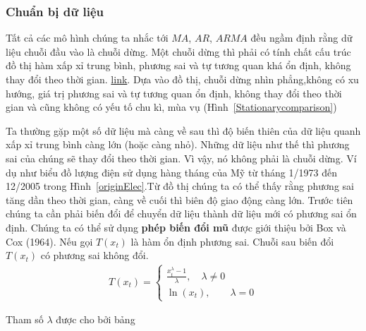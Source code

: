 \documentclass[twoside,12pt]{Latex/Classes/PhDthesisPSnPDF}
\begin{document}
\subsubsection{Chuẩn bị dữ liệu}
Tất cả các mô hình chúng ta nhắc tới $MA$, $AR$, $ARMA$ đều ngầm định rằng dữ liệu chuỗi đầu vào là chuỗi dừng. Một chuỗi dừng thì phải có tính chất cấu trúc đồ thị hàm xấp xỉ trung bình, phương sai và tự tương quan khá ổn định, không thay đổi theo thời gian. \href{http://www.itl.nist.gov/div898/handbook/pmc/section4/pmc442.htm} 
{link}{}. Dựa vào đồ thị, chuỗi dừng nhìn phẳng,không có xu hướng, giá trị phương sai và tự tương quan ổn định, không thay đổi theo thời gian và cũng không có yếu tố chu kì, mùa vụ (Hình~\ref{Stationarycomparison})

Ta thường gặp một số dữ liệu mà càng về sau thì độ biến thiên của dữ liệu quanh xấp xỉ trung bình càng lớn (hoặc càng nhỏ). Những dữ liệu như thế thì phương sai của chúng sẽ thay đổi theo thời gian. Vì vậy, nó không phải là chuỗi dừng. Ví dụ như biểu đồ lượng điện sử dụng hàng tháng của Mỹ từ tháng 1/1973 đến 12/2005 trong Hình~\ref{originElec}.Từ đồ thị chúng ta có thể thấy rằng phương sai tăng dần theo thời gian, càng về cuối thì biên độ giao động càng lớn. Trước tiên chúng ta cần phải biến đổi để chuyển dữ liệu thành dữ liệu mới có phương sai ổn định.
Chúng ta có thể sử dụng \textbf{phép biến đổi mũ} được giới thiệu bởi Box và Cox (1964). Nếu gọi $T(x_t)$ là hàm ổn định phương sai. Chuỗi sau biến đổi $T(x_t)$ có phương sai không đổi. 
\begin{align}
	T(x_t) = \begin{cases}
				\frac{x_t^{\lambda}-1}{\lambda},\quad \lambda \neq 0 \\
				\ln(x_t),\qquad \lambda = 0
			\end{cases}
\end{align}

Tham số $\lambda$ được cho bởi bảng
\end{document}
